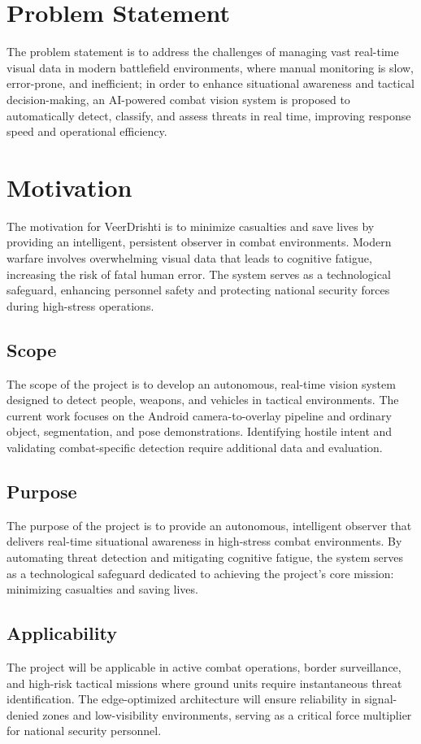 \section{Problem Statement}\label{sec:problem}
The problem statement is to address the challenges of managing vast real-time visual data in modern
battlefield environments, where manual monitoring is slow, error-prone, and inefficient; in order to
enhance situational awareness and tactical decision-making, an AI-powered combat vision system is
proposed to automatically detect, classify, and assess threats in real time, improving response
speed and operational efficiency.

\label{end:problem}
\section{Motivation}\label{sec:motivation}
The motivation for VeerDrishti is to minimize casualties and save lives by providing an intelligent,
persistent observer in combat environments. Modern warfare involves overwhelming visual data that
leads to cognitive fatigue, increasing the risk of fatal human error. The system serves as a
technological safeguard, enhancing personnel safety and protecting national security forces during
high-stress operations.

\subsection{Scope}
The scope of the project is to develop an autonomous, real-time vision system designed to detect
people, weapons, and vehicles in tactical environments. The current work focuses on the Android
camera-to-overlay pipeline and ordinary object, segmentation, and pose demonstrations. Identifying
hostile intent and validating combat-specific detection require additional data and evaluation.

\subsection{Purpose}
The purpose of the project is to provide an autonomous, intelligent observer that delivers real-time
situational awareness in high-stress combat environments. By automating threat detection and
mitigating cognitive fatigue, the system serves as a technological safeguard dedicated to achieving
the project's core mission: minimizing casualties and saving lives.

\subsection{Applicability}
The project will be applicable in active combat operations, border surveillance, and high-risk
tactical missions where ground units require instantaneous threat identification. The edge-optimized
architecture will ensure reliability in signal-denied zones and low-visibility environments, serving
as a critical force multiplier for national security personnel. \vspace{6pt}

